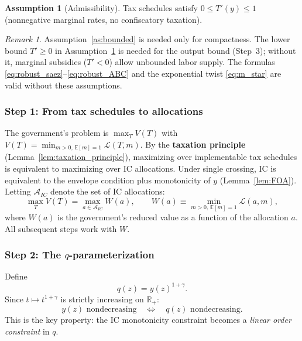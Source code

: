 \documentclass[12pt,a4paper]{article}
\theoremstyle{definition}
\newtheorem{assumption}{Assumption}[section]
\theoremstyle{plain}
\theoremstyle{remark}
\newtheorem{remark}{Remark}[section]
\newcommand{\R}{\mathbb{R}}
\newcommand{\E}{\mathbb{E}}
\newcommand{\calL}{\mathcal{L}}
\newcommand{\calA}{\mathcal{A}}
\begin{document}
\begin{assumption}[Admissibility]
\label{as:admissible}
Tax schedules satisfy $0 \leq T'(y) \leq 1$ (nonnegative
marginal rates, no confiscatory taxation).
\end{assumption}

\begin{remark}
Assumption~\ref{as:bounded} is needed only for compactness.
The lower bound $T' \geq 0$ in
Assumption~\ref{as:admissible} is needed for the output
bound (Step~3); without it, marginal subsidies ($T' < 0$)
allow unbounded labor supply.
The formulas
\eqref{eq:robust_saez}--\eqref{eq:robust_ABC} and the
exponential twist \eqref{eq:m_star} are valid without
these assumptions.
\end{remark}


\subsubsection{Step 1: From tax schedules to allocations}

The government's problem is $\max_T V(T)$ with
$V(T) = \min_{m>0,\,\E[m]=1}\calL(T,m)$.  By the
\textbf{taxation principle}
(Lemma~\ref{lem:taxation_principle}), maximizing over
implementable tax schedules is equivalent to maximizing
over IC allocations.  Under single crossing, IC is
equivalent to the envelope condition plus monotonicity
of $y$ (Lemma~\ref{lem:FOA}).  Letting $\calA_{IC}$
denote the set of IC allocations:
\begin{equation}
\label{eq:equivalence}
  \max_T V(T) = \max_{a \in \calA_{IC}} W(a),
  \qquad
  W(a) \equiv \min_{m>0,\,\E[m]=1}\calL(a,m),
\end{equation}
where $W(a)$ is the government's reduced value as a
function of the allocation $a$.  All subsequent steps
work with $W$.


\subsubsection{Step 2: The $q$-parameterization}

Define
\begin{equation}
\label{eq:q_def}
  q(z) = y(z)^{1+\gamma}.
\end{equation}
Since $t \mapsto t^{1+\gamma}$ is strictly increasing on
$\R_+$:
\begin{equation}
\label{eq:mono_equiv}
  y(z) \text{ nondecreasing}
  \quad\Longleftrightarrow\quad
  q(z) \text{ nondecreasing}.
\end{equation}
This is the key property: the IC monotonicity constraint
becomes a \emph{linear order constraint} in $q$.
\end{document}
